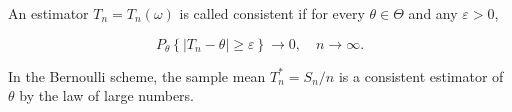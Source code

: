 An estimator $T_n = T_n(\omega)$ is called consistent if for every $\theta \in \Theta$ and any $\varepsilon > 0$,

$$P_\theta \left\{ |T_n - \theta| \geq \varepsilon \right\} \to 0, \quad n \to \infty.$$

In the Bernoulli scheme, the sample mean $T_n^* = S_n/n$ is a consistent estimator of $\theta$ by the law of large numbers.
